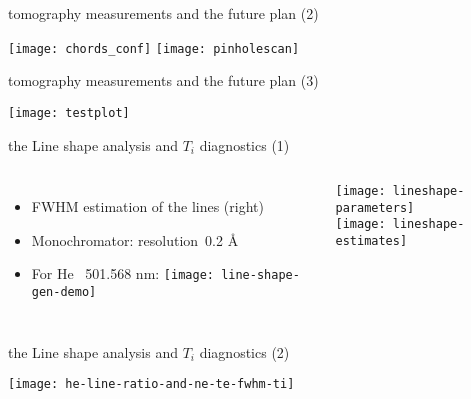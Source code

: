 \begin{frame}{tomography measurements and the future plan (2)}
    \vspace{-0.5em}
    \begin{center}
        \texttt{[image: chords\_conf]}
        \texttt{[image: pinholescan]}
    \end{center}
\end{frame}

\begin{frame}{tomography measurements and the future plan (3)}
    \vspace{-0.5em}
    \begin{center}
        \texttt{[image: testplot]}
    \end{center}
\end{frame}

\begin{frame}{the Line shape analysis and $T_i$ diagnostics (1)}
    \begin{columns}
      \centering
      \begin{itemize}
        \item FWHM estimation of the lines (right)
        \item Monochromator: resolution~0.2 \AA%
        \item For He ~501.568 nm:
            \texttt{[image: line-shape-gen-demo]}
      \end{itemize}

      \begin{center}
        \texttt{[image: lineshape-parameters]}\\
		\texttt{[image: lineshape-estimates]}
      \end{center}
    \end{columns}
\end{frame}

\begin{frame}{the Line shape analysis and $T_i$ diagnostics (2)}
    \vspace{-0.5em}
    \begin{center}
        \texttt{[image: he-line-ratio-and-ne-te-fwhm-ti]}
    \end{center}
\end{frame}

